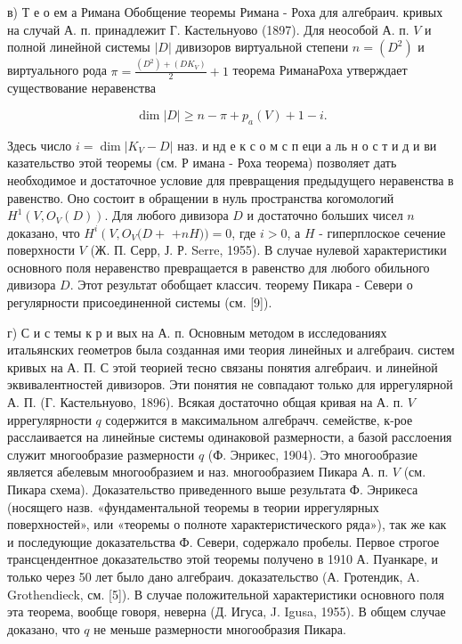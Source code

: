 \documentclass[10pt]{article}
\begin{document}
в) Т е о ем а Римана Обобщение теоремы Римана - Роха для алгебраич. кривых на случай А. п. принадлежит Г. Кастельнуово (1897). Для неособой А. п. $V$ и полной линейной системы $|D|$ дивизоров виртуальной степени $n=\left(D^{2}\right)$ и виртуального рода $\pi=\frac{\left(D^{2}\right)+\left(D K_{V}\right)}{2}+1$ теорема РиманаРоха утверждает существование неравенства



\[

\operatorname{dim}|D| \geqslant n-\pi+p_{a}(V)+1-i .

\]



Здесь число $i=\operatorname{dim}\left|K_{V}-D\right|$ наз. и нд е к с о м с п еци а ль н о с т и д и ви казательство этой теоремы (см. Р имана - Роха теорема) позволяет дать необходимое и достаточное условие для превращения предыдущего неравенства в равенство. Оно состоит в обращении в нуль пространства когомологий $H^{1}\left(V, O_{V}(D)\right)$. Для любого дивизора $D$ и достаточно больших чисел $n$ доказано, что $H^{i}\left(V, O_{V}(D+\right.$ $+n H))=0$, где $i>0$, а $H$ - гиперплоское сечение поверхности $V$ (Ж. П. Серр, Ј. Р. Serre, 1955). В случае нулевой характеристики основного поля неравенство превращается в равенство для любого обильного дивизора $D$. Этот результат обобщает классич. теорему Пикара - Севери о регулярности присоединенной системы (см. [9]).



г) С и с темы к р и вых на А. п. Основным методом в исследованиях итальянских геометров была созданная ими теория линейных и алгебраич. систем кривых на А. П. С этой теорией тесно связаны понятия алгебраич. и линейной эквивалентностей дивизоров. Эти понятия не совпадают только для иррегулярной А. П. (Г. Кастельнуово, 1896). Всякая достаточно общая кривая на А. п. $V$ иррегулярности $q$ содержится в максимальном алгебрачч. семействе, к-рое расслаивается на линейные системы одинаковой размерности, а базой расслоения служит многообразие размерности $q$ (Ф. Энрикес, 1904). Это многообразие является абелевым многообразием и наз. многообразием Пикара А. п. $V$ (см. Пикара схема). Доказательство приведенного выше результата Ф. Энрикеса (носящего назв. «фундаментальной теоремы в теории иррегулярных поверхностей», или «теоремы о полноте характеристического ряда»), так же как и последующие доказательства Ф. Севери, содержало пробелы. Первое строгое трансцендентное доказательство этой теоремы получено в 1910 А. Пуанкаре, и только через 50 лет было дано алгебраич. доказательство (А. Гротендик, A. Grothendieck, см. [5]). В случае положительной характеристики основного поля эта теорема, вообще говоря, неверна (Д. Игуса, J. Igusa, 1955). В общем случае доказано, что $q$ не меньше размерности многообразия Пикара.
\end{document}
